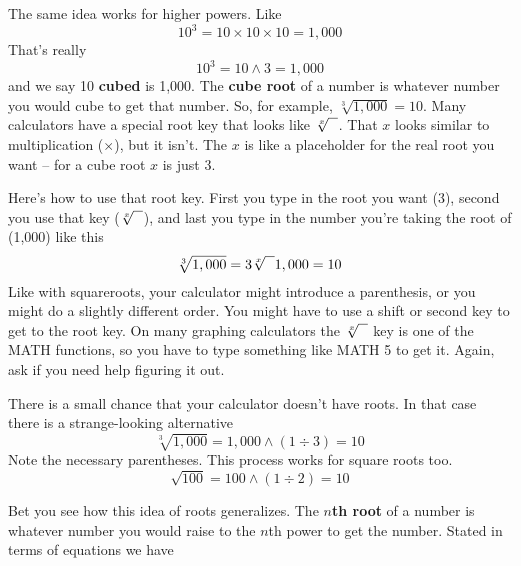 The same idea works for higher powers.  Like $$10^3 =10 \times 10 \times 10 = 1,000$$ That's really  $$10^3 = 10 \wedge 3 = 1,000$$ and we say
10 \textbf{cubed} is 1,000.  The \textbf{cube root} of a number is whatever number you would cube to get that number.  So, for example, $\sqrt[3]{1,000} = 10$.  Many calculators have a special root key that looks like $\sqrt[x]{\text{\raisebox{.6em}{~\text{  }}}} $.  That $x$ looks similar to multiplication ($\times$), but it isn't.  The $x$ is like a placeholder for the real root you want -- for a cube root $x$ is just 3.  

Here's how to use that root key. First you type in the root you want (3), second you use that key ($\sqrt[x]{\text{\raisebox{.6em}{~\text{  }}}} $), and last you type in the number you're taking the root of (1,000) like this
$$\sqrt[3]{1,000} = 3\sqrt[x]{\text{\raisebox{.6em}{~\text{  }}}}1,000= 10$$
Like with squareroots, your calculator might introduce a parenthesis, or you might do a slightly different order.  You might have to use a shift or second key to get to the root key.  On many graphing calculators the $\sqrt[x]{\text{\raisebox{.6em}{~\text{  }}}} $ key is one of the MATH functions, so you have to type something like MATH 5 to get it.  Again, ask if you need help figuring it out.  

There is a small chance that your calculator doesn't have roots.  In that case there is a strange-looking alternative
$$\sqrt[3]{1,000} = 1,000 \wedge (1 \div 3)= 10$$
Note the necessary parentheses. This process works for square roots too.
$$\sqrt{100} = 100 \wedge (1 \div 2)= 10$$

Bet you see how this idea of roots generalizes.  The \textbf{$n$th root} of a number is whatever number you would raise to the $n$th power to get the number.  Stated in terms of equations we have

 \bigskip
\bigskip

 